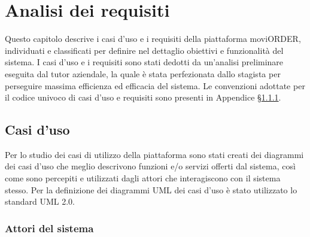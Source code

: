 
\chapter{Analisi dei requisiti}
\label{cap:analisi-requisiti}

Questo capitolo descrive i casi d'uso e i requisiti della piattaforma moviORDER, individuati e classificati per definire nel dettaglio obiettivi e funzionalità del sistema. I casi d'uso e i requisiti sono stati dedotti da un'analisi preliminare eseguita dal tutor aziendale, la quale è stata perfezionata dallo stagista per perseguire massima efficienza ed efficacia del sistema. Le convenzioni adottate per il codice univoco di casi d'uso e requisiti sono presenti in Appendice §\ref{}.

\section{Casi d'uso}

Per lo studio dei casi di utilizzo della piattaforma sono stati creati dei diagrammi dei casi d'uso che meglio descrivono funzioni e/o servizi offerti dal sistema, così come sono percepiti e utilizzati dagli attori che interagiscono con il sistema stesso. Per la definizione dei diagrammi UML dei casi d'uso è stato utilizzato lo standard UML 2.0.

\subsection{Attori del sistema}

